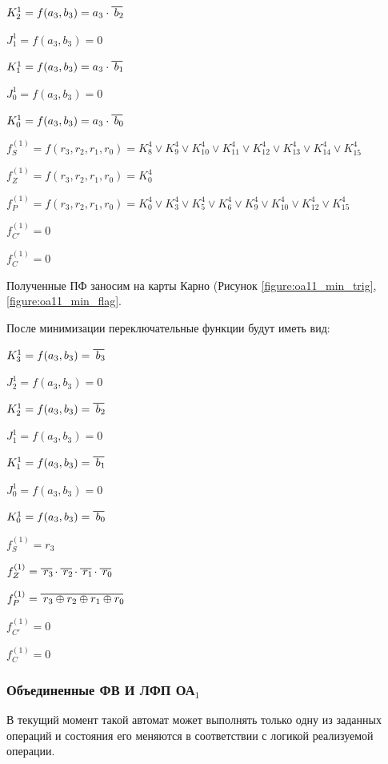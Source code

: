 $K^1_2 = f(a_3, b_3) = a_3 \cdot \oline{b_2}$

$J^1_1 = f(a_3, b_3) = 0$

$K^1_1 = f(a_3, b_3) = a_3 \cdot \oline{b_1}$

$J^1_0 = f(a_3, b_3) = 0$

$K^1_0 = f(a_3, b_3) = a_3 \cdot \oline{b_0}$


$f^{(1)}_{S} = f(r_3, r_2, r_1, r_0) = K^4_8 \vee K^4_9 \vee K^4_10 \vee K^4_11 \vee K^4_12 \vee K^4_13 \vee K^4_14 \vee K^4_15$

$f^{(1)}_{Z} = f(r_3, r_2, r_1, r_0) = K^4_0$

$f^{(1)}_{P} = f(r_3, r_2, r_1, r_0) = K^4_0 \vee K^4_3 \vee K^4_5 \vee K^4_6 \vee K^4_9 \vee K^4_10 \vee K^4_12 \vee K^4_15$

$f^{(1)}_{C'}= 0$

$f^{(1)}_{C} = 0$

Полученные ПФ заносим на карты Карно (Рисунок \ref{figure:oa11_min_trig}, \ref{figure:oa11_min_flag}.



После минимизации переключательные функции будут иметь вид:

$K^1_3 = f(a_3, b_3) = \oline{b_3}$

$J^1_2 = f(a_3, b_3) = 0$

$K^1_2 = f(a_3, b_3) = \oline{b_2}$

$J^1_1 = f(a_3, b_3) = 0$

$K^1_1 = f(a_3, b_3) = \oline{b_1}$

$J^1_0 = f(a_3, b_3) = 0$

$K^1_0 = f(a_3, b_3) = \oline{b_0}$

$f^{(1)}_{S} = r_3$

$f^{(1)}_{Z} = \oline{r_3} \cdot \oline{r_2} \cdot \oline{r_1} \cdot \oline{r_0}$

$f^{(1)}_{P} = \oline{r_3 \oplus r_2 \oplus r_1 \oplus r_0}$

$f^{(1)}_{C'}= 0$

$f^{(1)}_{C} = 0$


\subsubsection{Объединенные ФВ И ЛФП ОА${}_1$}

В текущий момент такой автомат может выполнять только одну из заданных операций и состояния его меняются в соответствии с логикой реализуемой операции.

